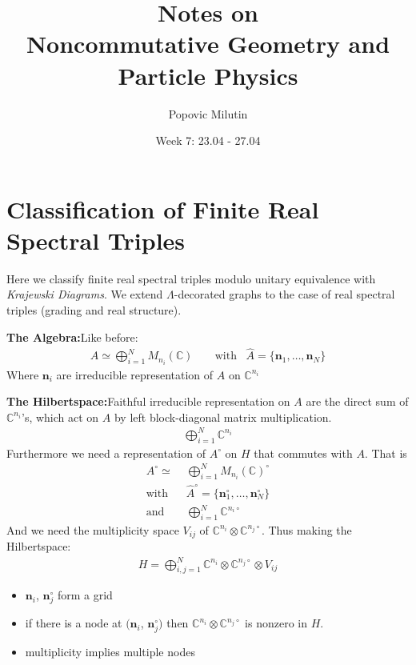 \documentclass[a4paper]{article}
\title{Notes on \\ Noncommutative Geometry and Particle Physics}
\author{Popovic Milutin}
\date{Week 7: 23.04 - 27.04}
\theoremstyle{definition}
\theoremstyle{definition}
\theoremstyle{definition}
\theoremstyle{theorem}
\theoremstyle{theorem}
\theoremstyle{theorem}
\begin{document}
\maketitle
\tableofcontents

\section{Classification of Finite Real Spectral Triples}

Here we classify finite real spectral triples modulo unitary equivalence with
\textit{Krajewski Diagrams}. We extend $\Lambda$-decorated graphs to the case of
real spectral triples (grading and real structure).

\textbf{The Algebra:}Like before:
\begin{align}
    A\simeq \bigoplus_{i=1}^N M_{n_i}(\mathbb{C}) \;\;\;\;\;\;\; \text{with} \;\;\; \hat{A} = \{\textbf{n}_1, \dots, \textbf{n}_N\}
\end{align}
Where $\textbf{n}_i$ are irreducible representation of $A$ on
$\mathbb{C}^{n_i}$

\textbf{The Hilbertspace:}Faithful irreducible representation on $A$ are the
direct sum of $\mathbb{C}^{n_i}$'s, which act on $A$ by left block-diagonal
matrix multiplication.
\begin{align}
    \bigoplus_{i=1}^N \mathbb{C}^{n_i}
\end{align}
Furthermore we need a representation of $A^\circ$ on $H$ that commutes with
$A$. That is
\begin{align}
    A^\circ \simeq &\bigoplus_{i=1}^N M_{n_i}(\mathbb{C})^\circ \\
        \text{with} \;\;\; &\hat{A}^\circ = \{\textbf{n}_1^\circ, \dots,
    \textbf{n}_N^\circ\} \\
    \text{and} \;\;\;  &\bigoplus_{i=1}^N \mathbb{C}^{n_i\circ}
\end{align}
And we need the multiplicity space $V_{ij}$ of $\mathbb{C}^{n_i} \otimes
\mathbb{C}^{n_j\circ}$.
Thus making the Hilbertspace:
\begin{align}
    H=\bigoplus_{i,j=1}^N \mathbb{C}^{n_i} \otimes \mathbb{C}^{n_j\circ}
    \otimes V_{ij}
\end{align}
\begin{itemize}
    \item $\textbf{n}_i$, $\textbf{n}_j^\circ$ form a grid
    \item if there is a node at $(\textbf{n}_i$, $\textbf{n}_j^\circ)$ then
            $\mathbb{C}^{n_i} \otimes \mathbb{C}^{n_j\circ}$ is nonzero in $H$.
    \item multiplicity implies multiple nodes
\end{itemize}
\end{document}
